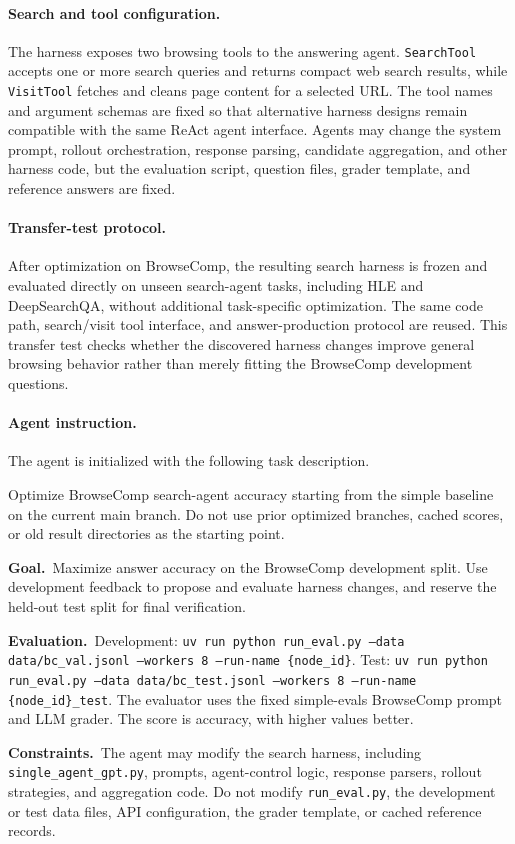 \paragraph{Search and tool configuration.}
The harness exposes two browsing tools to the answering agent.
\texttt{SearchTool} accepts one or more search queries and returns compact web
search results, while \texttt{VisitTool} fetches and cleans page content for a
selected URL.
The tool names and argument schemas are fixed so that alternative harness
designs remain compatible with the same ReAct agent interface.
Agents may change the system prompt, rollout orchestration, response parsing,
candidate aggregation, and other harness code, but the evaluation script,
question files, grader template, and reference answers are fixed.

\paragraph{Transfer-test protocol.}
After optimization on BrowseComp, the resulting search harness is frozen and
evaluated directly on unseen search-agent tasks, including HLE and
DeepSearchQA, without additional task-specific optimization.
The same code path, search/visit tool interface, and answer-production protocol
are reused.
This transfer test checks whether the discovered harness changes improve
general browsing behavior rather than merely fitting the BrowseComp development
questions.

\paragraph{Agent instruction.}
The agent is initialized with the following task description.

\begin{promptbox}[title=\textbf{BrowseComp Task Instruction}]
Optimize BrowseComp search-agent accuracy starting from the simple baseline on
the current main branch.
Do not use prior optimized branches, cached scores, or old result directories
as the starting point.

\smallskip
\noindent\textbf{Goal.}~Maximize answer accuracy on the BrowseComp
development split.
Use development feedback to propose and evaluate harness changes, and reserve
the held-out test split for final verification.

\smallskip
\noindent\textbf{Evaluation.}~Development:
\texttt{uv run python run\_eval.py --data data/bc\_val.jsonl --workers 8 --run-name \{node\_id\}}.
Test:
\texttt{uv run python run\_eval.py --data data/bc\_test.jsonl --workers 8 --run-name \{node\_id\}\_test}.
The evaluator uses the fixed simple-evals BrowseComp prompt and LLM grader.
The score is accuracy, with higher values better.

\smallskip
\noindent\textbf{Constraints.}~The agent may modify the search harness,
including \texttt{single\_agent\_gpt.py}, prompts, agent-control logic,
response parsers, rollout strategies, and aggregation code.
Do not modify \texttt{run\_eval.py}, the development or test data files, API
configuration, the grader template, or cached reference records.
\end{promptbox}

